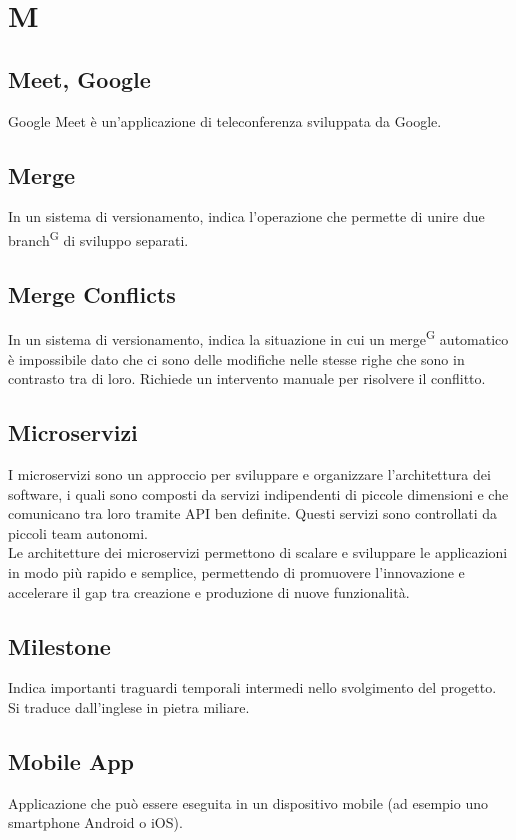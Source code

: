 \section{M}

\subsection{Meet, Google}
Google Meet è un'applicazione di teleconferenza sviluppata da Google. 

\subsection{Merge}
In un sistema di versionamento, indica l'operazione che permette di unire due branch\textsuperscript{G} di sviluppo separati.

\subsection{Merge Conflicts}
In un sistema di versionamento, indica la situazione in cui un merge\textsuperscript{G} automatico è impossibile dato che ci sono delle modifiche nelle stesse righe che sono in contrasto tra di loro. Richiede un intervento manuale  per risolvere il conflitto.

\subsection{Microservizi} I microservizi sono un approccio per sviluppare e organizzare l’architettura dei software, i quali sono composti da servizi indipendenti di piccole dimensioni e che comunicano tra loro tramite API ben definite. Questi servizi sono controllati da piccoli team autonomi. \\
Le architetture dei microservizi permettono di scalare e sviluppare le applicazioni in modo più rapido e semplice, permettendo di promuovere l’innovazione e accelerare il gap tra creazione e produzione di nuove funzionalità.

\subsection{Milestone}
Indica importanti traguardi temporali intermedi nello svolgimento del progetto. Si traduce dall'inglese in pietra miliare. 

\subsection{Mobile App} Applicazione che può essere eseguita in un dispositivo mobile (ad esempio uno smartphone Android o iOS).

\clearpage